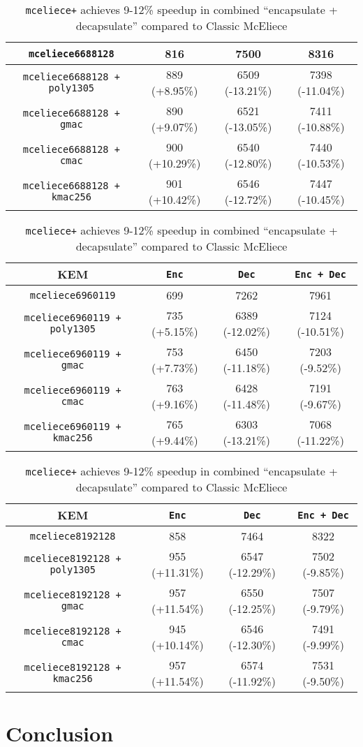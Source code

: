 \documentclass[runningheads]{llncs}
\begin{document}
\begin{table}[h]
\begin{tabular}[c]{|c|c|c|c|}
        \hline
        \texttt{mceliece6688128} & 816 & 7500 & 8316 \\
        \hline
        \texttt{mceliece6688128 + poly1305} & 889 (+8.95\%) & 6509 (-13.21\%) & 7398 (-11.04\%) \\
        \hline
        \texttt{mceliece6688128 + gmac} & 890 (+9.07\%) & 6521 (-13.05\%) & 7411 (-10.88\%) \\
        \hline
        \texttt{mceliece6688128 + cmac} & 900 (+10.29\%) & 6540 (-12.80\%) & 7440 (-10.53\%) \\
        \hline
        \texttt{mceliece6688128 + kmac256} & 901 (+10.42\%) & 6546 (-12.72\%) & 7447 (-10.45\%) \\
        \hline
    \end{tabular}
    \begin{tabular}[c]{|c|c|c|c|}
        \hline
        KEM & \texttt{Enc} & \texttt{Dec} & \texttt{Enc + Dec} \\
        \hline
        \texttt{mceliece6960119} & 699 & 7262 & 7961 \\
        \hline
        \texttt{mceliece6960119 + poly1305} & 735 (+5.15\%) & 6389 (-12.02\%) & 7124 (-10.51\%) \\
        \hline
        \texttt{mceliece6960119 + gmac} & 753 (+7.73\%) & 6450 (-11.18\%) & 7203 (-9.52\%) \\
        \hline
        \texttt{mceliece6960119 + cmac} & 763 (+9.16\%) & 6428 (-11.48\%) & 7191 (-9.67\%) \\
        \hline
        \texttt{mceliece6960119 + kmac256} & 765 (+9.44\%) & 6303 (-13.21\%) & 7068 (-11.22\%) \\
        \hline
    \end{tabular}
    \begin{tabular}[c]{|c|c|c|c|}
        \hline
        KEM & \texttt{Enc} & \texttt{Dec} & \texttt{Enc + Dec} \\
        \hline
        \texttt{mceliece8192128} & 858 & 7464 & 8322 \\
        \hline
        \texttt{mceliece8192128 + poly1305} & 955 (+11.31\%) & 6547 (-12.29\%) & 7502 (-9.85\%) \\
        \hline
        \texttt{mceliece8192128 + gmac} & 957 (+11.54\%) & 6550 (-12.25\%) & 7507 (-9.79\%) \\
        \hline
        \texttt{mceliece8192128 + cmac} & 945 (+10.14\%) & 6546 (-12.30\%) & 7491 (-9.99\%) \\
        \hline
        \texttt{mceliece8192128 + kmac256} & 957 (+11.54\%) & 6574 (-11.92\%) & 7531 (-9.50\%) \\
        \hline
    \end{tabular}
    \caption{\texttt{mceliece+} achieves 9-12\% speedup in combined ``encapsulate + decapsulate'' compared to Classic McEliece}\label{tbl:mceliece-plus-performance}
\end{table}

\section{Conclusion}



\end{document}
